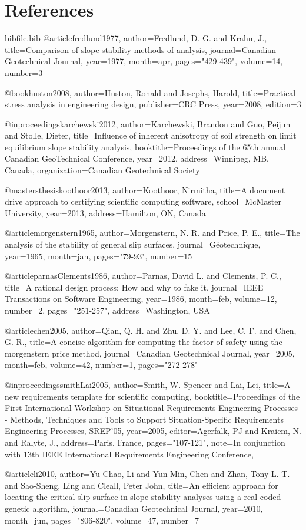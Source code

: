 \documentclass[12pt]{article}
\begin{document}
\section{References}
\label{Sec:References}
\begin{filecontents*}{bibfile.bib}
@article{fredlund1977,
author={Fredlund, D. G. and Krahn, J.},
title={Comparison of slope stability methods of analysis},
journal={Canadian Geotechnical Journal},
year={1977},
month=apr,
pages={"429-439"},
volume={14},
number={3}}

@book{huston2008,
author={Huston, Ronald and Josephs, Harold},
title={Practical stress analysis in engineering design},
publisher={CRC Press},
year={2008},
edition={3}}

@inproceedings{karchewski2012,
author={Karchewski, Brandon and Guo, Peijun and Stolle, Dieter},
title={Influence of inherent anisotropy of soil strength on limit equilibrium slope stability analysis},
booktitle={Proceedings of the 65th annual Canadian GeoTechnical Conference},
year={2012},
address={Winnipeg, MB, Canada},
organization={Canadian Geotechnical Society}}

@mastersthesis{koothoor2013,
author={Koothoor, Nirmitha},
title={A document drive approach to certifying scientific computing software},
school={McMaster University},
year={2013},
address={Hamilton, ON, Canada}}

@article{morgenstern1965,
author={Morgenstern, N. R. and Price, P. E.},
title={The analysis of the stability of general slip surfaces},
journal={Géotechnique},
year={1965},
month=jan,
pages={"79-93"},
number={15}}

@article{parnasClements1986,
author={Parnas, David L. and Clements, P. C.},
title={A rational design process: How and why to fake it},
journal={IEEE Transactions on Software Engineering},
year={1986},
month=feb,
volume={12},
number={2},
pages={"251-257"},
address={Washington, USA}}

@article{chen2005,
author={Qian, Q. H. and Zhu, D. Y. and Lee, C. F. and Chen, G. R.},
title={A concise algorithm for computing the factor of safety using the morgenstern price method},
journal={Canadian Geotechnical Journal},
year={2005},
month=feb,
volume={42},
number={1},
pages={"272-278"}}

@inproceedings{smithLai2005,
author={Smith, W. Spencer and Lai, Lei},
title={A new requirements template for scientific computing},
booktitle={Proceedings of the First International Workshop on Situational Requirements Engineering Processes - Methods, Techniques and Tools to Support Situation-Specific Requirements Engineering Processes, SREP'05},
year={2005},
editor={Agerfalk, PJ and Kraiem, N. and Ralyte, J.},
address={Paris, France},
pages={"107-121"},
note={In conjunction with 13th IEEE International Requirements Engineering Conference,}}

@article{li2010,
author={Yu-Chao, Li and Yun-Min, Chen and Zhan, Tony L. T. and Sao-Sheng, Ling and Cleall, Peter John},
title={An efficient approach for locating the critical slip surface in slope stability analyses using a real-coded genetic algorithm},
journal={Canadian Geotechnical Journal},
year={2010},
month=jun,
pages={"806-820"},
volume={47},
number={7}}
\end{filecontents*}
\nocite{*}
\printbibliography[heading=none]
\end{document}
